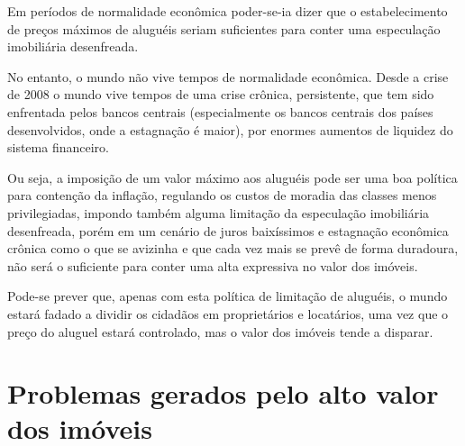 \documentclass[
	12pt,				%
	oneside,			%
	a4paper,			%
	chapter=TITLE,		%
	section=TITLE,		%
	english,			%
	brazil				%
	]{abntex2}
\begin{document}
Em períodos de normalidade econômica poder-se-ia dizer que o estabelecimento
de preços máximos de aluguéis seriam suficientes para conter uma especulação
imobiliária desenfreada.

No entanto, o mundo não vive tempos de normalidade econômica. Desde a crise de
2008 o mundo vive tempos de uma crise crônica, persistente, que tem sido
enfrentada pelos bancos centrais (especialmente os bancos centrais dos países
desenvolvidos, onde a estagnação é maior), por enormes aumentos de liquidez
do sistema financeiro.

Ou seja, a imposição de um valor máximo aos aluguéis pode ser uma boa política
para contenção da inflação, regulando os custos de moradia das classes menos
privilegiadas, impondo também alguma limitação da especulação imobiliária
desenfreada, porém em um cenário de juros baixíssimos e estagnação econômica
crônica como o que se avizinha e que cada vez mais se prevê de forma duradoura,
não será o suficiente para conter uma alta expressiva no valor dos imóveis.

Pode-se prever que, apenas com esta política de limitação de aluguéis, o mundo
estará fadado a dividir os cidadãos em proprietários e locatários, uma vez que o
preço do aluguel estará controlado, mas o valor dos imóveis tende a disparar.

\hypertarget{problemas-gerados-pelo-alto-valor-dos-imuxf3veis}{%
\section{Problemas gerados pelo alto valor dos imóveis}\label{problemas-gerados-pelo-alto-valor-dos-imuxf3veis}}
\end{document}

